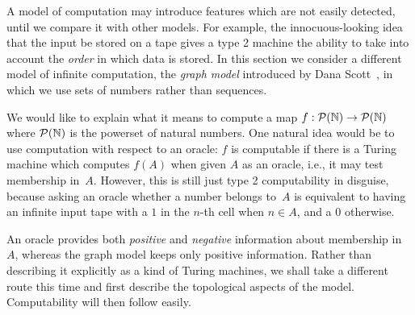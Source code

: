 A model of computation may introduce features which are not easily
detected, until we compare it with other models. For example, the
innocuous-looking idea that the input be stored on a tape gives a type
2 machine the ability to take into account the \emph{order} in which
data is stored. In this section we consider a different model of
infinite computation, the \emph{graph model} introduced by Dana
Scott~\cite{graph-model}, in which we use sets of numbers rather than
sequences.

We would like to explain what it means to compute a map $f : \mathcal{P}(\mathbb{N})
\to \mathcal{P}(\mathbb{N})$ where $\mathcal{P}(\mathbb{N})$ is the powerset of natural numbers.
One natural idea would be to use computation with respect to an
oracle: $f$ is computable if there is a Turing machine which computes
$f(A)$ when given $A$ as an oracle, i.e., it may test membership
in~$A$. However, this is still just type 2 computability in disguise,
because asking an oracle whether a number belongs to~$A$ is equivalent
to having an infinite input tape with a $1$ in the $n$-th cell when $n
\in A$, and a $0$ otherwise.

An oracle provides both \emph{positive} and \emph{negative}
information about membership in~$A$, whereas the graph model keeps
only positive information. Rather than describing it explicitly as a
kind of Turing machines, we shall take a different route this time and
first describe the topological aspects of the model. Computability
will then follow easily.

